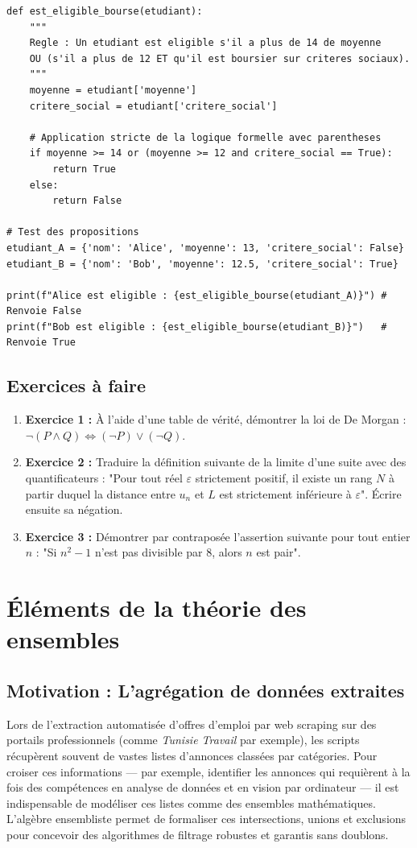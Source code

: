 \documentclass[12pt,a4paper]{report}
\begin{document}
\begin{lstlisting}
def est_eligible_bourse(etudiant):
    """
    Regle : Un etudiant est eligible s'il a plus de 14 de moyenne 
    OU (s'il a plus de 12 ET qu'il est boursier sur criteres sociaux).
    """
    moyenne = etudiant['moyenne']
    critere_social = etudiant['critere_social']
    
    # Application stricte de la logique formelle avec parentheses
    if moyenne >= 14 or (moyenne >= 12 and critere_social == True):
        return True
    else:
        return False

# Test des propositions
etudiant_A = {'nom': 'Alice', 'moyenne': 13, 'critere_social': False}
etudiant_B = {'nom': 'Bob', 'moyenne': 12.5, 'critere_social': True}

print(f"Alice est eligible : {est_eligible_bourse(etudiant_A)}") # Renvoie False
print(f"Bob est eligible : {est_eligible_bourse(etudiant_B)}")   # Renvoie True
\end{lstlisting}

\subsection{Exercices à faire}
\begin{enumerate}
    \item \textbf{Exercice 1 :} À l'aide d'une table de vérité, démontrer la loi de De Morgan : $\neg(P \land Q) \iff (\neg P) \lor (\neg Q)$.
    \item \textbf{Exercice 2 :} Traduire la définition suivante de la limite d'une suite avec des quantificateurs : "Pour tout réel $\varepsilon$ strictement positif, il existe un rang $N$ à partir duquel la distance entre $u_n$ et $L$ est strictement inférieure à $\varepsilon$". Écrire ensuite sa négation.
    \item \textbf{Exercice 3 :} Démontrer par contraposée l'assertion suivante pour tout entier $n$ : "Si $n^2 - 1$ n'est pas divisible par $8$, alors $n$ est pair".
\end{enumerate}

\section{Éléments de la théorie des ensembles}

\subsection{Motivation : L'agrégation de données extraites}
Lors de l'extraction automatisée d'offres d'emploi par web scraping sur des portails professionnels (comme \textit{Tunisie Travail} par exemple), les scripts récupèrent souvent de vastes listes d'annonces classées par catégories. Pour croiser ces informations — par exemple, identifier les annonces qui requièrent à la fois des compétences en analyse de données et en vision par ordinateur — il est indispensable de modéliser ces listes comme des ensembles mathématiques. L'algèbre ensembliste permet de formaliser ces intersections, unions et exclusions pour concevoir des algorithmes de filtrage robustes et garantis sans doublons.
\end{document}
